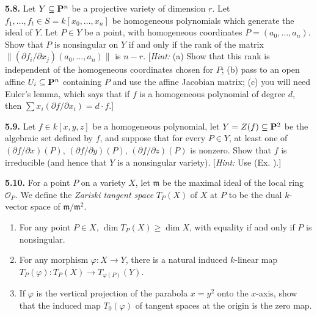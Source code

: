{\smallskip
\noindent\hypertarget{ex-I-5.8}{}\textbf{5.8.} Let $Y\subseteq\mathbf{P}^n$ be a projective variety of dimension $r$. Let $f_1,\ldots,f_t\in S=k[x_0,\ldots,x_n]$ be homogeneous polynomials which generate the ideal of $Y$. Let $P\in Y$ be a point, with homogeneous coordinates $P=(a_0,\ldots,a_n)$. Show that $P$ is nonsingular on $Y$ if and only if the rank of the matrix $\lVert(\partial f_i/\partial x_j)(a_0,\ldots,a_n)\rVert$ is $n-r$. [\emph{Hint:} (a) Show that this rank is independent of the homogeneous coordinates chosen for $P$; (b) pass to an open affine $U_i\subseteq\mathbf{P}^n$ containing $P$ and use the affine Jacobian matrix; (c) you will need Euler's lemma, which says that if $f$ is a homogeneous polynomial of degree $d$, then $\sum x_i(\partial f/\partial x_i)=d\cdot f$.]

\smallskip
\noindent\hypertarget{ex-I-5.9}{}\hypertarget{err-I-5-9}{}\textbf{5.9.} Let $f\in k[x,y,z]$ be a homogeneous polynomial, let $Y=Z(f)\subseteq\mathbf{P}^2$ be the algebraic set defined by $f$, and suppose that for every $P\in Y$, at least one of $(\partial f/\partial x)(P)$, $(\partial f/\partial y)(P)$, $(\partial f/\partial z)(P)$ is nonzero. Show that $f$ is irreducible (and hence that $Y$ is a nonsingular variety). [\emph{Hint:} Use (Ex. ).]

\smallskip
\noindent\hypertarget{ex-I-5.10}{}\textbf{5.10.} For a point $P$ on a variety $X$, let $\mathfrak m$ be the maximal ideal of the local ring $\mathcal O_P$. We define the \emph{Zariski tangent space} $T_P(X)$ of $X$ at $P$ to be the dual $k$-vector space of $\mathfrak m/\mathfrak m^2$.
\begin{enumerate}[label=(\alph*),leftmargin=2.4em,nosep]
\item For any point $P\in X$, $\dim T_P(X)\ge\dim X$, with equality if and only if $P$ is nonsingular.
\item For any morphism $\varphi\colon X\to Y$, there is a natural induced $k$-linear map $T_P(\varphi)\colon T_P(X)\to T_{\varphi(P)}(Y)$.
\item If $\varphi$ is the vertical projection of the parabola $x=y^2$ onto the $x$-axis, show that the induced map $T_0(\varphi)$ of tangent spaces at the origin is the zero map.
\end{enumerate}}
